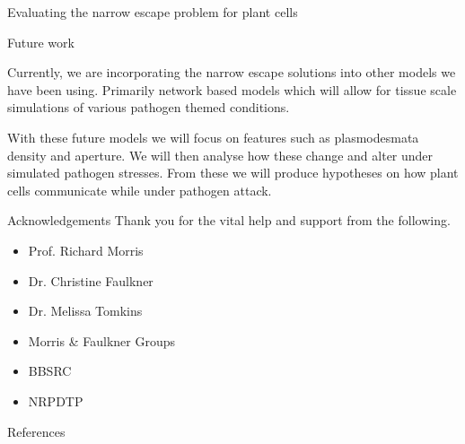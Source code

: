 \documentclass[final]{beamer}
\begin{document}
\begin{frame}{}
\begin{textblock}{28}
\begin{block}{Evaluating the narrow escape problem for plant cells}
    \end{block}


    \begin{block}{Future work}

      Currently, we are incorporating the narrow escape
      solutions into other models we have been using. Primarily
      network based models which will allow for tissue scale
      simulations of various pathogen themed conditions.

      \vspace{1cm}

      With these future models we will focus on features such as
      plasmodesmata density and aperture. We will then analyse how
      these change and alter under simulated pathogen stresses. From
      these we will produce hypotheses on how plant cells communicate
      while under pathogen attack.

    \end{block}



    \begin{block}{Acknowledgements}
      Thank you for the vital help and support from the following.

      \begin{multicols}{3}

        \begin{itemize}
        \item{Prof. Richard Morris}
        \item{Dr. Christine Faulkner}

        \end{itemize}

        \columnbreak

        \begin{itemize}
        \item{Dr. Melissa Tomkins}
        \item{Morris \& Faulkner Groups}

        \end{itemize}

        \columnbreak

        \begin{itemize}
        \item{BBSRC}
        \item{NRPDTP}
        \end{itemize}

      \end{multicols}

    \end{block}

    \begin{block}{References}
      
      
    \end{block}


  \end{textblock}

\end{frame}
\end{document}
